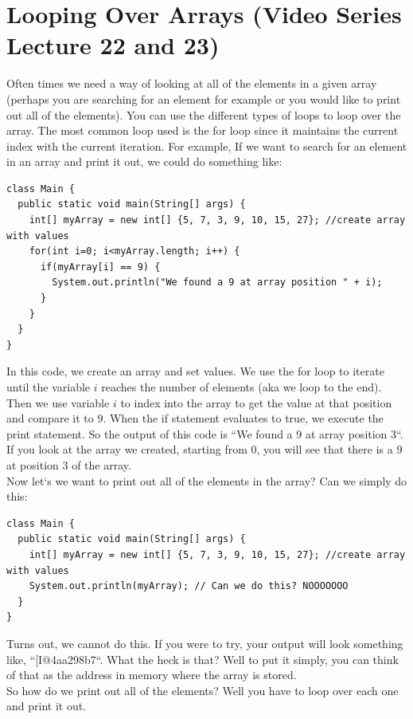 \documentclass[11]{article}
\begin{document}
\section{Looping Over Arrays (Video Series Lecture 22 and 23)}
Often times we need a way of looking at all of the elements in a given array (perhaps you are searching for an element for example or you would like to print out all of the elements). You can use the different types of loops to loop over the array. The most common loop used is the for loop since it maintains the current index with the current iteration. For example, If we want to search for an element in an array and print it out, we could do something like:

\begin{lstlisting}
class Main {
  public static void main(String[] args) {
    int[] myArray = new int[] {5, 7, 3, 9, 10, 15, 27}; //create array with values
    for(int i=0; i<myArray.length; i++) {
      if(myArray[i] == 9) {
        System.out.println("We found a 9 at array position " + i);
      }
    }
  }
}
\end{lstlisting}
In this code, we create an array and set values. We use the for loop to iterate until the variable $i$ reaches the number of elements (aka we loop to the end). Then we use variable $i$ to index into the array to get the value at that position and compare it to $9$. When the if statement evaluates to true, we execute the print statement. So the output of this code is ``We found a 9 at array position $3$``. If you look at the array we created, starting from $0$, you will see that there is a $9$ at position $3$ of the array.\\

Now let`s we want to print out all of the elements in the array? Can we simply do this:

\begin{lstlisting}
class Main {
  public static void main(String[] args) {
    int[] myArray = new int[] {5, 7, 3, 9, 10, 15, 27}; //create array with values
	System.out.println(myArray); // Can we do this? NOOOOOOO
  }
}
\end{lstlisting}

Turns out, we cannot do this. If you were to try, your output will look something like, ``[I@4aa298b7``. What the heck is that? Well to put it simply, you can think of that as the address in memory where the array is stored.\\

So how do we print out all of the elements? Well you have to loop over each one and print it out.
\end{document}
